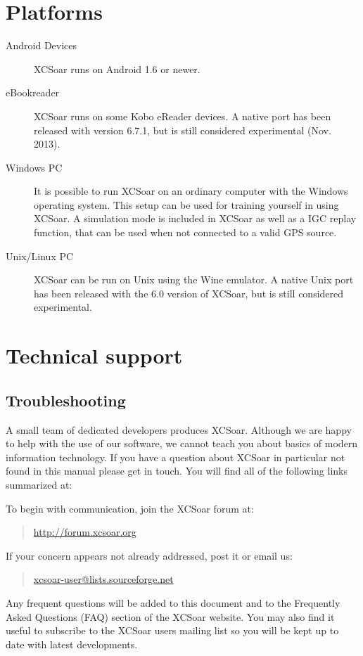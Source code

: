 \section{Platforms}
\begin{description}
\item[Android Devices]
XCSoar runs on Android 1.6 or newer.
\item [eBookreader]
XCSoar runs on some Kobo eReader devices. A native port has been released with version 6.7.1, but is still considered experimental (Nov. 2013).
\item[Windows PC]
It is possible to run XCSoar on an ordinary computer with the Windows
operating system. This setup can be used for training yourself in using XCSoar.
A simulation mode is included in XCSoar as well as a IGC replay function, that
can be used when not connected to a valid GPS source.
\item[Unix/Linux PC]
XCSoar can be run on Unix using the Wine emulator. A native Unix port
has been released with the 6.0 version of XCSoar, but is still
considered experimental.
\end{description}



\section{Technical support}

\subsection*{Troubleshooting}
A small team of dedicated developers produces XCSoar. Although we are
happy to help with the use of our software, we cannot teach you about
basics of modern information technology. If you have a question about XCSoar in
particular not found in this manual please get in touch. You will find all of the following links summarized at:
\begin{quote}
\end{quote}
To begin with communication, join the XCSoar forum at:
\begin{quote}
\url{http://forum.xcsoar.org}
\end{quote}
If your concern appears not already addressed, post it or email us: 
\begin{quote}
\href{mailto:xcsoar-user@lists.sourceforge.net}{xcsoar-user@lists.sourceforge.net}
\end{quote}
Any frequent questions will be added to this document and to the Frequently
Asked Questions (FAQ) section of the XCSoar website.
You may also find it useful to subscribe to the XCSoar users mailing
list so you will be kept up to date with latest developments.

